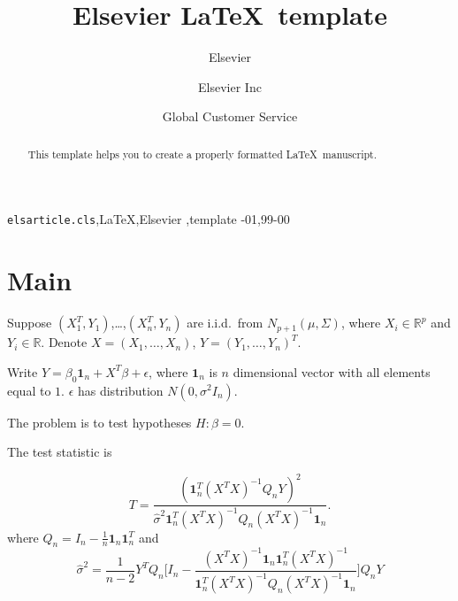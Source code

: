 \documentclass[review]{elsarticle}
\theoremstyle{plain}
\theoremstyle{definition}
\theoremstyle{remark}
\begin{document}
\begin{frontmatter}

\title{Elsevier \LaTeX\ template}

\author{Elsevier}
\address{Radarweg 29, Amsterdam}

\author[mymainaddress,mysecondaryaddress]{Elsevier Inc}

\author[mysecondaryaddress]{Global Customer Service}

\address[mymainaddress]{1600 John F Kennedy Boulevard, Philadelphia}
\address[mysecondaryaddress]{360 Park Avenue South, New York}

\begin{abstract}
This template helps you to create a properly formatted \LaTeX\ manuscript.
\end{abstract}

\begin{keyword}
\texttt{elsarticle.cls}\sep \LaTeX\sep Elsevier \sep template
-01\sep  99-00
\end{keyword}

\end{frontmatter}

\linenumbers

\section{Main}

Suppose $(X_1^T,Y_1)$,\ldots,$(X_n^T, Y_n)$ are i.i.d.\ from $N_{p+1}(\mu,\Sigma)$, where $X_i\in \mathbb{R}^p$ and $Y_i\in \mathbb{R}$. Denote $X=(X_1,\ldots,X_n)$, $Y=(Y_1,\ldots,Y_n)^T$.

Write $Y=\beta_0 \textbf{1}_n+X^T \beta+\epsilon$, where $\textbf{1}_n$ is $n$ dimensional vector with all elements equal to $1$. $\epsilon$ has distribution $N(0,\sigma^2 I_n)$.

The problem is to test hypotheses $H: \beta=0$.

The test statistic is

\[
    T=\frac{
        (\textbf{1}_n^T(X^T X)^{-1}Q_n Y)^2
    }{
        \hat{\sigma}^2
        \textbf{1}_n^T(X^T X)^{-1}Q_n (X^T X)^{-1}\textbf{1}_n
    }.
\]
where $Q_n=I_n-\frac{1}{n}\textbf{1}_n\textbf{1}_n^T$ and
\[
    \hat{\sigma}^2=\frac{1}{n-2} Y^T Q_n\Big[
        I_n-\frac{(X^T X)^{-1}\textbf{1}_n\textbf{1}_n^T(X^T X)^{-1}}{
        \textbf{1}_n^T(X^T X)^{-1}Q_n(X^T X)^{-1}\textbf{1}_n
        }
        \Big]Q_n Y
\] 
\end{document}

